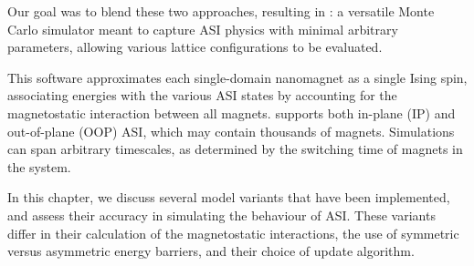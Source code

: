 Our goal was to blend these two approaches, resulting in \hotspice: a versatile Monte Carlo simulator meant to capture ASI physics with minimal arbitrary parameters, allowing various lattice configurations to be evaluated. \par
This software approximates each single-domain nanomagnet as a single Ising spin, associating energies with the various ASI states by accounting for the magnetostatic interaction between all magnets.
\hotspice supports both in-plane (IP) and out-of-plane (OOP) ASI, which may contain thousands of magnets. Simulations can span arbitrary timescales, as determined by the switching time of magnets in the system. \\\par

In this chapter, we discuss several model variants that have been implemented, and assess their accuracy in simulating the behaviour of ASI.
These variants differ in their calculation of the magnetostatic interactions, the use of symmetric versus asymmetric energy barriers, and their choice of update algorithm. \\\par

